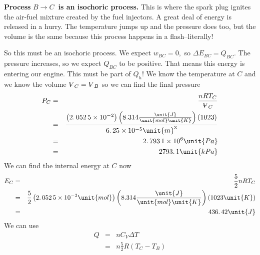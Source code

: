 \documentclass{article}
\begin{document}
\textbf{Process }$B\rightarrow C$\textbf{\ is an isochoric process.} %
This is where the spark plug ignites the air-fuel mixture created by the
fuel injectors. A great deal of energy is released in a hurry. The
temperature jumps up and the pressure does too, but the volume is the same
because this process happens in a flash--literally!

So this must be an isochoric process. We expect $w_{BC}=0,$ so $\Delta
E_{BC}=Q_{BC}.$ The pressure increases, so we expect $Q_{BC}$ to be
positive. That means this energy is entering our engine. This must be part
of $Q_{h}$! We know the temperature at $C$ and we know the volume $%
\ooalign{\hfil$V$\hfil\cr\kern0.1em--\hfil\cr}%
_{C}=%
\ooalign{\hfil$V$\hfil\cr\kern0.1em--\hfil\cr}%
_{B}$ so we can find the final pressure%
\begin{eqnarray*}
P_{C} &=&\frac{nRT_{C}}{%
\ooalign{\hfil$V$\hfil\cr\kern0.1em--\hfil\cr}%
_{C}} \\
&=&\frac{\left( 2.\,052\,5\times 10^{-2}\right) \left( 8.314\frac{\unit{J}}{%
\unit{mol}\unit{K}}\right) \left( 1023\right) }{6.\,25\times 10^{-5}\unit{m}%
^{3}} \\
&=&2.\,\allowbreak 793\,1\times 10^{6}\unit{Pa} \\
&=&2793.\,\allowbreak 1\unit{kPa}
\end{eqnarray*}%
We can find the internal energy at $C$ now%
\begin{eqnarray*}
E_{C} &=&\frac{5}{2}nRT_{C} \\
&=&\frac{5}{2}\left( \allowbreak 2.\,\allowbreak 052\,5\times 10^{-2}\unit{%
mol}\right) \left( 8.314\frac{\unit{J}}{\unit{mol}\unit{K}}\right) \left(
1023\unit{K}\right) \\
&=&\allowbreak 436.\,\allowbreak 42\unit{J}
\end{eqnarray*}%
We can use 
\begin{eqnarray*}
Q &=&nC_{V}\Delta T \\
&=&n\frac{5}{2}R\left( T_{C}-T_{B}\right)
\end{eqnarray*}%
\end{document}
